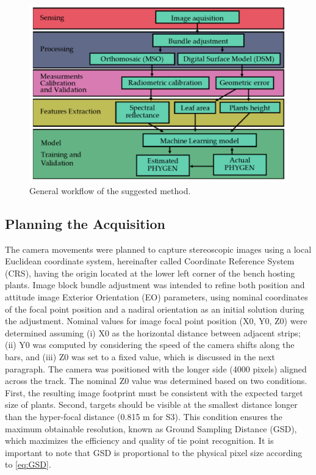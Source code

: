 \documentclass[12pt,a4paper,oneside]{report}
\begin{document}
\begin{figure}[H]
    \centering
    \includegraphics[width=\textwidth]{Images/agronomy-14-00306-g003}
    \caption{General workflow of the suggested method.}
    \label{fig:workflow}
\end{figure}

\subsection{Planning the Acquisition}

The camera movements were planned to capture stereoscopic images using a local Euclidean coordinate system, hereinafter called Coordinate Reference System (CRS), having the origin located at the lower left corner of the bench hosting plants.
Image block bundle adjustment was intended to refine both position and attitude image Exterior Orientation (EO) parameters, using nominal coordinates of the focal point position and a nadiral orientation as an initial solution during the adjustment.
Nominal values for image focal point position (X0, Y0, Z0) were determined assuming (i) X0 as the horizontal distance between adjacent strips; (ii) Y0 was computed by considering the speed of the camera shifts along the bars, and (iii) Z0 was set to a fixed value, which is discussed in the next paragraph. The camera was positioned with the longer side (4000 pixels) aligned across the track.
The nominal Z0 value was determined based on two conditions. First, the resulting image footprint must be consistent with the expected target size of plants. Second, targets should be visible at the smallest distance longer than the hyper-focal distance (0.815 m for S3). This condition ensures the maximum obtainable resolution, known as Ground Sampling Distance (GSD), which maximizes the efficiency and quality of tie point recognition. It is important to note that GSD is proportional to the physical pixel size according to
\cref{eq:GSD}.
\end{document}
